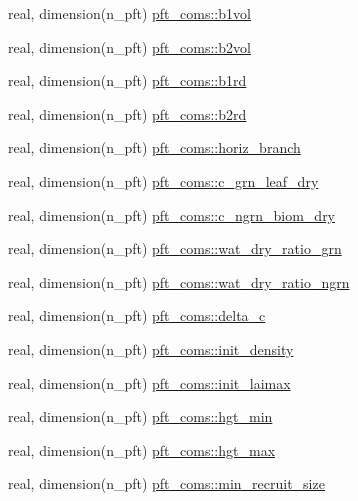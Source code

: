 \begin{DoxyCompactItemize}
\item 
real, dimension(n\+\_\+pft) \hyperlink{namespacepft__coms_a44136dea8d02d3eba884e01b192a6895}{pft\+\_\+coms\+::b1vol}
\item 
real, dimension(n\+\_\+pft) \hyperlink{namespacepft__coms_a54ac66449833305ba8a3c3415044856d}{pft\+\_\+coms\+::b2vol}
\item 
real, dimension(n\+\_\+pft) \hyperlink{namespacepft__coms_a012ba0e0102bf2d9db7ef42b187326d5}{pft\+\_\+coms\+::b1rd}
\item 
real, dimension(n\+\_\+pft) \hyperlink{namespacepft__coms_abfac20b7a9e8b92da039ecc3b59dfdc3}{pft\+\_\+coms\+::b2rd}
\item 
real, dimension(n\+\_\+pft) \hyperlink{namespacepft__coms_a8727392237e76b0ac668b40267b5db14}{pft\+\_\+coms\+::horiz\+\_\+branch}
\item 
real, dimension(n\+\_\+pft) \hyperlink{namespacepft__coms_a07a700fcd19f741c23db148885753d33}{pft\+\_\+coms\+::c\+\_\+grn\+\_\+leaf\+\_\+dry}
\item 
real, dimension(n\+\_\+pft) \hyperlink{namespacepft__coms_a59778cca6e42ffcda34a2b44b31c0d80}{pft\+\_\+coms\+::c\+\_\+ngrn\+\_\+biom\+\_\+dry}
\item 
real, dimension(n\+\_\+pft) \hyperlink{namespacepft__coms_a93b820778e953be06816231daa419ca5}{pft\+\_\+coms\+::wat\+\_\+dry\+\_\+ratio\+\_\+grn}
\item 
real, dimension(n\+\_\+pft) \hyperlink{namespacepft__coms_a4228db82826a9e2afbe3646586c0c4ac}{pft\+\_\+coms\+::wat\+\_\+dry\+\_\+ratio\+\_\+ngrn}
\item 
real, dimension(n\+\_\+pft) \hyperlink{namespacepft__coms_af5eccca1ecf526e4e6ece4c5e47d2bf8}{pft\+\_\+coms\+::delta\+\_\+c}
\item 
real, dimension(n\+\_\+pft) \hyperlink{namespacepft__coms_aad950f9e3b7c51796f0c72acbf85198d}{pft\+\_\+coms\+::init\+\_\+density}
\item 
real, dimension(n\+\_\+pft) \hyperlink{namespacepft__coms_aee1c14f39841cdf40c9655ae6eab2e85}{pft\+\_\+coms\+::init\+\_\+laimax}
\item 
real, dimension(n\+\_\+pft) \hyperlink{namespacepft__coms_aab740dc3cca80fdd00440b412f111a74}{pft\+\_\+coms\+::hgt\+\_\+min}
\item 
real, dimension(n\+\_\+pft) \hyperlink{namespacepft__coms_a81703797d07f20bd129277ed6a78e30e}{pft\+\_\+coms\+::hgt\+\_\+max}
\item 
real, dimension(n\+\_\+pft) \hyperlink{namespacepft__coms_a4a008038dd34f2531f2ca7637c6e74b0}{pft\+\_\+coms\+::min\+\_\+recruit\+\_\+size}

\end{DoxyCompactItemize}

